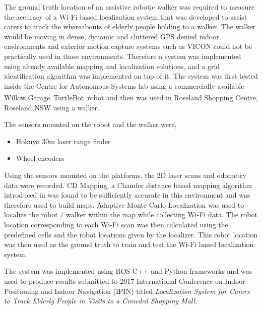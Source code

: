 \documentclass[12pt,a4paper]{report}
\begin{document}
The ground truth location of an assistive robotic walker was required to measure the accuracy of a Wi-Fi based localization system that was  developed to assist carers to track the whereabouts of elderly people holding to a walker. The walker would be moving in dense, dynamic and cluttered GPS denied indoor environments and exterior motion capture systems such as VICON could not be practically used in those environments. Therefore a system was implemented using already available mapping and localization solutions, and a grid identification algorithm was implemented on top of it. The system was first tested inside the Centre for Autonomous Systems lab using a commercially available Willow Garage\textsuperscript{\textregistered}\ TurtleBot\texttrademark\ robot and then was used in Roseland Shopping Centre, Roseland NSW using a walker. \par

The sensors mounted on the robot and the walker were,
\begin{itemize}
\item Hokuyo 30m laser range finder
\item Wheel encoders
\end{itemize}

Using the sensors mounted on the platforms, the 2D laser scans and odometry data were recorded. CD Mapping, a Chamfer distance based mapping algorithm introduced in \cite{dantanarayana2016navigation} was found to be sufficiently accurate in this environment and was therefore used to build maps. Adaptive Monte Carlo Localization was used to localize the robot / walker within the map while collecting Wi-Fi data. The robot location corresponding to each Wi-Fi scan was then calculated using the predefined cells and the robot locations given by the localizer. This robot location was then used as the ground truth to train and test the Wi-Fi based localization system.\par
% 
% 
% 
% 
% 
The system was implemented using ROS C++ and Python frameworks and was used to produce results submitted to 2017 International Conference on Indoor Positioning and Indoor Navigation (IPIN) titled \textit{Localization System for Carers to Track Elderly People in Visits to a Crowded Shopping Mall}. 
\end{document}
